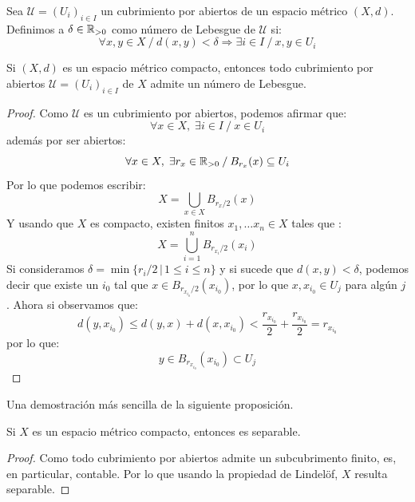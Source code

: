 \documentclass[12pt,a4paper]{book}
\begin{document}
\begin{defi}
Sea $\mathcal{U} = (U_i)_{i \in I}$ un cubrimiento por abiertos de un espacio métrico $(X,d)$. Definimos a $\delta \in \mathbb{R}_{>0}$ como número de Lebesgue de $\mathcal{U}$ si:
$$ \forall x,y \in X \: \slash \: d(x,y) < \delta \Rightarrow \exists i \in I \: \slash \: x,y \in U_i$$
\end{defi}
\begin{prop}
Si $(X,d)$ es un espacio métrico compacto, entonces todo cubrimiento por abiertos $\mathcal{U} = (U_i)_{i \in I}$ de $X$ admite un número de Lebesgue.
\begin{proof}
Como $\mathcal{U}$ es un cubrimiento por abiertos, podemos afirmar que:
$$ \forall x \in X, \; \exists i\in I \: \slash \: x \in U_i$$
además por ser abiertos:
$$\forall x\in X, \; \exists r_x \in \mathbb{R}_{>0} \: \slash \: B_{r_x}(x) \subseteq U_i$$
Por lo que podemos escribir:
$$ X = \bigcup_{x\in X} B_{r_x/2}(x)$$
Y usando que $X$ es compacto, existen finitos $ x_1, \ldots x_n \in X $ tales que :
$$ X = \bigcup_{i=1}^n B_{r_{x_i}/2}(x_i)$$
Si consideramos $\delta = \min \{r_i/2\,\vert\,  1\leq i \leq n \}$ y si sucede que $d(x,y) < \delta$, podemos decir que existe un $i_0$ tal que
$ x \in B_{r_{x_{i_0}}/2}(x_{i_0})$, por lo que $ x, x_{i_0} \in U_j$ para algún $j$. Ahora si observamos que:
$$d(y,x_{i_0}) \leq d(y,x) + d(x,x_{i_0}) < \frac{r_{x_{i_0}}}{2} + \frac{r_{x_{i_0}}}{2} = r_{x_{i_0}}$$
por lo que:
$$ y \in B_{r_{x_{i_0}}}(x_{i_0}) \subset U_j$$
\end{proof}
\end{prop}
Una demostración más sencilla de la siguiente proposición.
\begin{prop}
Si $X$ es un espacio métrico compacto, entonces es separable.
\begin{proof}
Como todo cubrimiento por abiertos admite un subcubrimento finito, es, en particular, contable. Por lo que usando la propiedad de Lindelöf, $X$ resulta separable.
\end{proof}
\end{prop}
\end{document}
